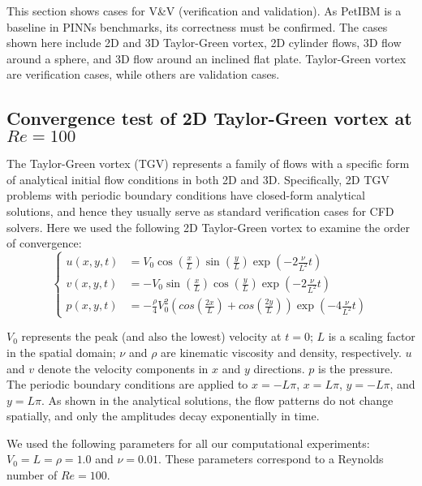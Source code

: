 This section shows cases for V\&V (verification and validation).
As PetIBM is a baseline in PINNs benchmarks, its correctness must be confirmed.
The cases shown here include 2D and 3D Taylor-Green vortex, 2D cylinder flows, 3D flow around a sphere, and 3D flow around an inclined flat plate.
Taylor-Green vortex are verification cases, while others are validation cases.

\subsection*{Convergence test of 2D Taylor-Green vortex at $Re=100$}

The Taylor-Green vortex (TGV) represents a family of flows with a specific form of analytical initial flow conditions in both 2D and 3D.
Specifically, 2D TGV problems with periodic boundary conditions have closed-form analytical solutions, and hence they usually serve as standard verification cases for CFD solvers. 
Here we used the following 2D Taylor-Green vortex to examine the order of convergence:
\begin{equation}\label{eq:tgv}
    \left\{
        \begin{aligned}
            u(x, y, t) &= V_0\cos(\frac{x}{L})\sin(\frac{y}{L})\exp(-2\frac{\nu}{L^2}t) \\
            v(x, y, t) &= - V_0 \sin(\frac{x}{L})\cos(\frac{y}{L})\exp(-2\frac{\nu}{L^2}t) \\
            p(x, y, t) &= -\frac{\rho}{4}V_0^2\left(cos(\frac{2x}{L}) + cos(\frac{2y}{L})\right)\exp(-4\frac{\nu}{L^2}t)
        \end{aligned}
    \right.
\end{equation}

\noindent $V_0$ represents the peak (and also the lowest) velocity at $t=0$;
$L$ is a scaling factor in the spatial domain;
$\nu$ and $\rho$ are kinematic viscosity and density, respectively.
$u$ and $v$ denote the velocity components in $x$ and $y$ directions.
$p$ is the pressure.
The periodic boundary conditions are applied to $x=-L\pi$, $x=L\pi$, $y=-L\pi$, and $y=L\pi$.
As shown in the analytical solutions, the flow patterns do not change spatially, and only the amplitudes decay exponentially in time.

We used the following parameters for all our computational experiments: $V_0=L=\rho=1.0$ and $\nu=0.01$.
These parameters correspond to a Reynolds number of $Re=100$.

